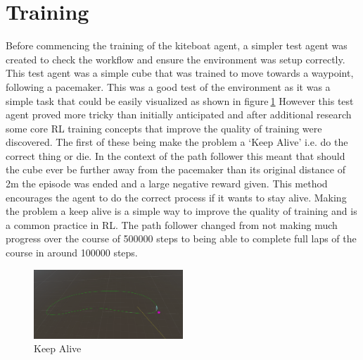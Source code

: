 \section{Training}\label{sec:training}
Before commencing the training of the kiteboat agent, a simpler test agent was created to check the workflow and ensure the environment was setup correctly. This test agent was a simple cube that was trained to move towards a waypoint, following a pacemaker. This was a good test of the environment as it was a simple task that could be easily visualized as shown in figure$~$\ref{pathFollower} However this test agent proved more tricky than initially anticipated and after additional research some core RL training concepts that improve the quality of training were discovered. The first of these being make the problem a `Keep Alive' i.e. do the correct thing or die. In the context of the path follower this meant that should the cube ever be further away from the pacemaker than its original distance of 2m the episode was ended and a large negative reward given. This method encourages the agent to do the correct process if it wants to stay alive. Making the problem a keep alive is a simple way to improve the quality of training and is a common practice in RL. The path follower changed from not making much progress over the course of 500000 steps to being able to complete full laps of the course in around 100000 steps.

\begin{figure}[h]
    \centering
    \includegraphics[width=0.5\textwidth]{Images/practiceTraining.png}
    \caption{Keep Alive}\label{pathFollower}
\end{figure}

